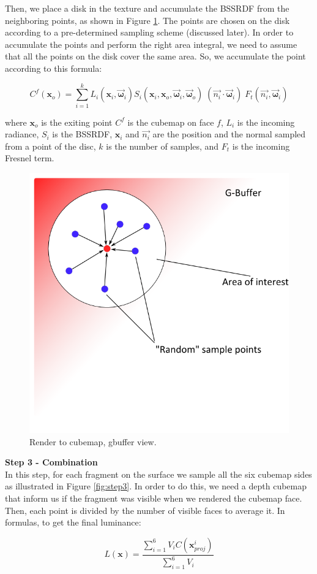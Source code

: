 Then, we place a disk in the texture and accumulate the BSSRDF from the neighboring points, as shown in Figure \ref{fig:stepgbuffer}. The points are chosen on the disk according to a pre-determined sampling scheme (discussed later). In order to accumulate the points and perform the right area integral, we need to assume that all the points on the disk cover the same area. So, we accumulate the point according to this formula:


\[
C^f(\mathbf{x}_o) = \sum_{i = 1}^{k} L_i(\mathbf{x}_i,\vec{\mathbf{\omega}}_i) S_i(\mathbf{x}_i,\mathbf{x}_o,\vec{\mathbf{\omega}}_i, \vec{\mathbf{\omega}}_o) \; (\vec{n_i}\cdot \vec{\mathbf{\omega}}_i) \; F_t(\vec{n_i},\vec{\mathbf{\omega}}_i) 
\]

where $\mathbf{x}_o$ is the exiting point $C^f$ is the cubemap on face $f$, $L_i$ is the incoming radiance, $S_i$ is the BSSRDF, $\mathbf{x}_i$ and $\vec{n_i}$ are the position and the normal sampled from a point of the disc, $k$ is the number of samples, and $F_t$ is the incoming Fresnel term.

\begin{figure}[!ht]
\centering
\includegraphics[width=0.5 \linewidth]{images/method/method_gbuffer}
\caption{Render to cubemap, gbuffer view.}
\label{fig:stepgbuffer}
\end{figure} 

\FloatBarrier
\textbf{Step 3 - Combination} \\
In this step, for each fragment on the surface we sample all the six cubemap sides as illustrated in Figure \ref{fig:step3}. In order to do this, we need a depth cubemap that inform us if the fragment was visible when we rendered the cubemap face. Then, each point is divided by the number of visible faces to average it. In formulas, to get the final luminance:

$$
L(\mathbf{x}) = \frac{\sum_{i = 1}^{6}V_{i}C(\mathbf{x}_{proj}^i)}{\sum_{i = 1}^{6}V_{i}}
$$

